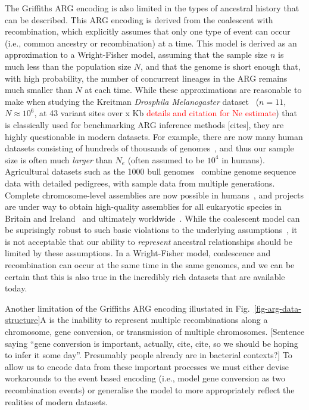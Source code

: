 \documentclass{article}
\begin{document}
The Griffiths ARG encoding is also limited in the types of ancestral
history that can be described. This ARG encoding is derived from the coalescent
with recombination, which explicitly assumes that only one type
of event can occur (i.e., common ancestry or recombination) at a
time. This model is derived as an approximation to a Wright-Fisher
model, assuming that the sample size $n$ is much less than the
population size $N$, and that the genome is short enough that,
with high probability, the number of concurrent lineages in the ARG remains
much smaller than $N$ at each time. While these approximations are
reasonable
to make when studying the Kreitman \emph{Drosphila Melanogaster}
dataset~\citep{kreitman1983nucleotide} ($n=11$, $N\approx 10^6$,
at 43 variant sites over x Kb \textcolor{red}{details and citation
for Ne estimate}) that is classically used for benchmarking
ARG inference methods [cites],
they are highly questionable in modern datasets. %
For example, there are now many
human datasets consisting of hundreds of thousands of
genomes~\citep{bycroft2018genome,karczewski2020mutational,tanjo2021practical},
and thus our sample size is often much \emph{larger} than $N_e$
(often assumed to be $10^4$ in humans).
Agricultural datasets such as the 1000 bull genomes~\citep{hayes20191000}
combine genome sequence data with detailed pedigrees, with
sample data from multiple generations.
Complete chromosome-level assemblies are now possible
in humans~\citep{miga2020telomere},
and projects are under way to obtain high-quality assemblies
for all eukaryotic species in Britain and Ireland~\citep{darwin2022sequence}
and ultimately worldwide~\citep{lewin2022earth}.
While the coalescent model can be suprisingly robust to such
basic violations to the underlying assumptions~\citep{
wakeley2012gene,bhaskar2014distortion,nelson2020accounting},
it is not acceptable that our ability to \emph{represent}
ancestral relationships should be limited by these assumptions.
In a Wright-Fisher model, coalescence and recombination can
occur at the same time in the same genomes, and we can be
certain that this is also true in the incredibly rich
datasets that are available today.

Another limitation of the Griffiths ARG encoding illustated in
Fig.~\ref{fig-arg-data-structure}A is the inability to represent
multiple recombinations along a chromosome, gene conversion,
or transmission of multiple chromosomes.
[Sentence saying ``gene conversion is important, actually, cite, cite,
so we should be hoping to infer it some day''. Presumably people
already are in bacterial contexts?]
To allow us to encode data from these important processes we
must either devise workarounds to the event based encoding
(i.e., model gene conversion as two recombination events) or
generalise the model to more appropriately reflect the realities
of modern datasets.
\end{document}
